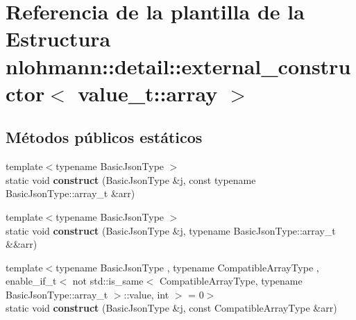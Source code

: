 \hypertarget{structnlohmann_1_1detail_1_1external__constructor_3_01value__t_1_1array_01_4}{}\section{Referencia de la plantilla de la Estructura nlohmann\+:\+:detail\+:\+:external\+\_\+constructor$<$ value\+\_\+t\+:\+:array $>$}
\label{structnlohmann_1_1detail_1_1external__constructor_3_01value__t_1_1array_01_4}
\subsection*{Métodos públicos estáticos}
\begin{DoxyCompactItemize}
\item 
\mbox{\label{structnlohmann_1_1detail_1_1external__constructor_3_01value__t_1_1array_01_4_abfb2a6eec0bc21e8a7438546aebc55d8}} 
{\footnotesize template$<$typename Basic\+Json\+Type $>$ }\\static void {\bfseries construct} (Basic\+Json\+Type \&j, const typename Basic\+Json\+Type\+::array\+\_\+t \&arr)
\item 
\mbox{\label{structnlohmann_1_1detail_1_1external__constructor_3_01value__t_1_1array_01_4_a50474d6624957a630a1d398cac1e7bfa}} 
{\footnotesize template$<$typename Basic\+Json\+Type $>$ }\\static void {\bfseries construct} (Basic\+Json\+Type \&j, typename Basic\+Json\+Type\+::array\+\_\+t \&\&arr)
\item 
\mbox{\label{structnlohmann_1_1detail_1_1external__constructor_3_01value__t_1_1array_01_4_a110f50fd5378da876d9a6d6a8d945e37}} 
{\footnotesize template$<$typename Basic\+Json\+Type , typename Compatible\+Array\+Type , enable\+\_\+if\+\_\+t$<$ not std\+::is\+\_\+same$<$ Compatible\+Array\+Type, typename Basic\+Json\+Type\+::array\+\_\+t $>$\+::value, int $>$  = 0$>$ }\\static void {\bfseries construct} (Basic\+Json\+Type \&j, const Compatible\+Array\+Type \&arr)

\end{DoxyCompactItemize}
